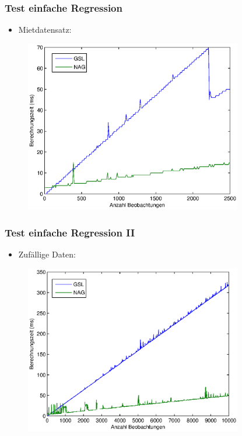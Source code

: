 \documentclass{beamer}
\begin{document}
\begin{frame}
  \frametitle{Test einfache Regression} 
  
  \begin{itemize}
  \item Mietdatensatz:
  \end{itemize}

  \begin{figure}[t]
    \centering
    \includegraphics[width=9.5cm]{figures/simple_reg_comp_rent.eps}
  \end{figure}

\end{frame}

\begin{frame}
  \frametitle{Test einfache Regression II}

  \begin{itemize}
  \item Zufällige Daten:
  \end{itemize}
  
  \begin{figure}[t]
    \centering
    \includegraphics[width=9.5cm]{figures/simple_reg_comp.eps}
  \end{figure}

\end{frame}
\end{document}
